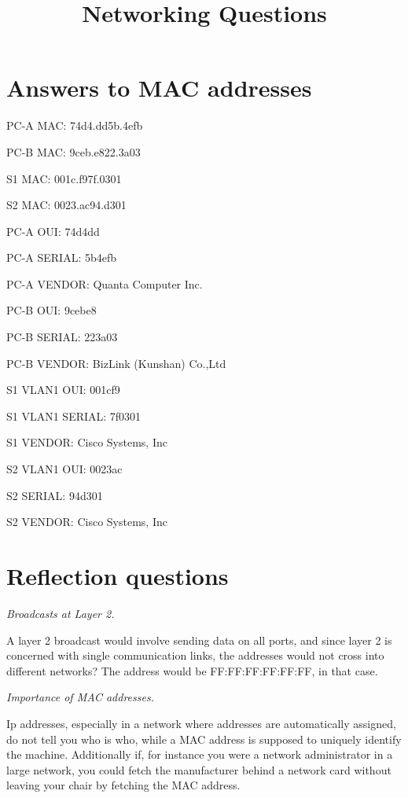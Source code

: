 

\title{\huge{Networking Questions}}
\author{}
\date{}


\maketitle

\section{Answers to MAC addresses}
PC-A MAC: 74d4.dd5b.4efb

PC-B MAC: 9ceb.e822.3a03

S1 MAC: 001c.f97f.0301

S2 MAC: 0023.ac94.d301

PC-A OUI: 74d4dd

PC-A SERIAL: 5b4efb

PC-A VENDOR: Quanta Computer Inc. 

PC-B OUI: 9cebe8

PC-B SERIAL: 223a03 

PC-B VENDOR: BizLink (Kunshan) Co.,Ltd 

S1 VLAN1 OUI: 001cf9

S1 VLAN1 SERIAL: 7f0301

S1 VENDOR: Cisco Systems, Inc 

S2 VLAN1 OUI: 0023ac 

S2 SERIAL: 94d301 

S2 VENDOR: Cisco Systems, Inc

\newpage
\section{Reflection questions}
\emph{Broadcasts at Layer 2.}

A layer 2 broadcast would involve sending data on all ports, 
and since layer 2 is concerned with single communication links, 
the addresses would not cross into different networks?
The address would be FF:FF:FF:FF:FF:FF, in that case.

\emph{Importance of MAC addresses.}

Ip addresses, especially in a network where addresses are automatically
assigned, do not tell you who is who, while a MAC address 
is supposed to uniquely identify the machine.
Additionally if, for instance you were a network administrator in a 
large network, you could fetch the manufacturer behind a network card 
without leaving your chair by fetching the MAC address. 




